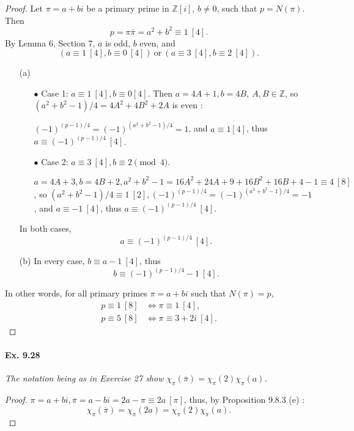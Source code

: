 \documentclass[11pt,a4paper]{article}
\newcommand{\Z}{\mathbb{Z}}
\begin{document}
\begin{proof}
Let $\pi=a+bi$ be a primary prime in $\mathbb{Z}[i]$, $b\neq 0$, such that $p = N(\pi)$. Then
$$p = \pi \bar{\pi}=a^2+b^2\equiv 1 \ [4].$$
By Lemma 6, Section 7, $a$ is odd, $b$ even, and 
 $$(a\equiv 1\ [4], b\equiv 0 \ [4])\ \mathrm{or}\  (a\equiv 3\  [4], b\equiv 2 \ [4]) .$$
\begin{enumerate}
\item[(a)]
	\begin{enumerate}
	\item[$\bullet$] Case 1: $a \equiv 1 \ [4], b \equiv 0 [4]$. Then
	$a=4A+1,b=4B,\ A,B \in \Z$, so  $(a^2+b^2-1)/4= 4A^2+4B^2+2A$ is even : 

	$(-1)^{(p-1)/4} = (-1)^{(a^2+b^2-1)/4} = 1$, and $a\equiv 1 [4]$, thus $a \equiv (-1)^{(p-1)/4} \ [4]$.
	\item[$\bullet$] Case 2: $ a\equiv 3 \ [4], b \equiv 2 \pmod 4$.
	
	$a=4A+3,b=4B+2, a^2+b^2-1 = 16 A^2+24A+9+16B^2+16B+4-1 \equiv 4 \ [8]$, so $(a^2+b^2-1)/4 \equiv 1 \ [2], (-1)^{(p-1)/4} = (-1)^{(a^2+b^2-1)/4} = -1$, and $a \equiv -1\ [4]$, thus  $a \equiv (-1)^{(p-1)/4} \ [4]$.
	\end{enumerate}
	In both cases, 
	$$ a \equiv (-1)^{(p-1)/4} \ [4].$$
\item[(b)] In every case, $b \equiv a-1 \ [4]$, thus
$$ b \equiv (-1)^{(p-1)/4}-1 \ [4].$$

\end{enumerate}
In other words, for all primary primes $\pi = a + bi$ such that $N(\pi) = p$,
\begin{align*}
p \equiv 1\ [8] &\iff \pi  \equiv 1 \ [4],\\
p \equiv 5\ [8] &\iff \pi  \equiv 3 + 2i \ [4].
\end{align*}
\end{proof}

\paragraph{Ex. 9.28}

{\it The notation being as in Exercise 27 show $\chi_\pi(\overline{\pi}) = \chi_\pi(2) \chi_\pi(a)$.
}

\begin{proof}
$\pi = a+bi,\overline{\pi} = a-bi = 2a-\pi \equiv 2a \ [\pi]$, thus, by Proposition 9.8.3 (e) :
 $$\chi_\pi(\overline{\pi}) = \chi_\pi(2a) = \chi_\pi(2) \chi_\pi(a).$$
\end{proof}
\end{document}
